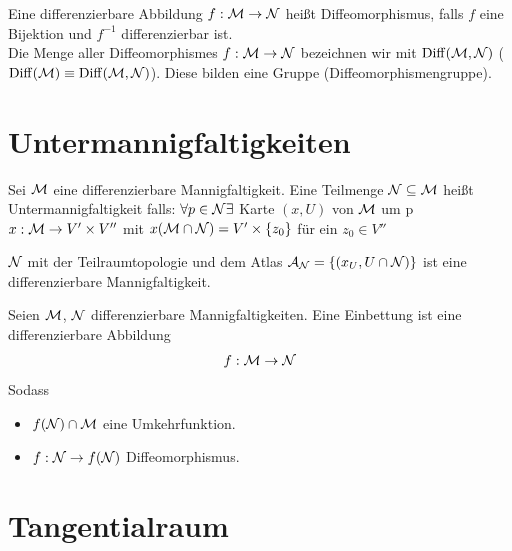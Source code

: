 \begin{defs}[Diffeomorphismus]
Eine differenzierbare Abbildung $f: \mathcal{M} \to \mathcal{N}$ heißt Diffeomorphismus, falls $f$ eine Bijektion und $f^{-1}$ differenzierbar ist. \\
Die Menge aller Diffeomorphismes $f: \mathcal{M} \to \mathcal{N}$ bezeichnen wir mit $\operatorname{Diff}(\mathcal{M}, \mathcal{N})$
($\operatorname{Diff}(\mathcal{M}) \equiv \operatorname{Diff}(\mathcal{M}, \mathcal{N})$).
Diese bilden eine Gruppe (Diffeomorphismengruppe).
\end{defs}


\section{Untermannigfaltigkeiten}

\begin{defs}[Untermannigfaltigkeiten]
Sei $\mathcal{M}$ eine differenzierbare Mannigfaltigkeit. 
Eine Teilmenge $\mathcal{N} \subseteq \mathcal{M}$ heißt Untermannigfaltigkeit falls:
$\forall p \in \mathcal{N} \exists$ Karte $(x, U)$ von $\mathcal{M}$ um p $x: \mathcal{M} \to V' \times V''$ mit $x(\mathcal{M} \cap \mathcal{N}) = V' \times \{z_0 \}$
für ein $z_0 \in V''$
\end{defs}


\begin{bem}
$\mathcal{N}$ mit der Teilraumtopologie und dem Atlas $\mathcal{A}_{\mathcal{N}} = \{ (x_U, U \cap \mathcal{N} ) \}$ ist eine differenzierbare Mannigfaltigkeit.
\end{bem}

\begin{defs}[Einbettung]
Seien $\mathcal{M}$, $\mathcal{N}$ differenzierbare Mannigfaltigkeiten. 
Eine Einbettung ist eine differenzierbare Abbildung
\begin{align}
f: \mathcal{M} \to \mathcal{N} 
\end{align}
Sodass
\begin{itemize}
\item $f(\mathcal{N}) \cap \mathcal{M}$ eine Umkehrfunktion.
\item $f: \mathcal{N} \to f(\mathcal{N})$ Diffeomorphismus.
\end{itemize}
\end{defs}


\section{Tangentialraum} 


